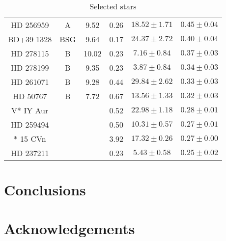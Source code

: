 \documentclass[fleqn,usenatbib]{mnras}
\begin{document}
\begin{table}
\begin{center}
\begin{tabular}{c c c c c c}
HD 256959 &A&9.52& 0.26 & $18.52\pm 1.71$& $0.45 \pm 0.04$\\
BD+39 1328&BSG&9.64 &  0.17 & $24.37  \pm    2.72$ & $0.40 \pm 0.04$\\
HD 278115&B	&10.02&  0.23 &  $7.16  \pm    0.84$ & $0.37 \pm 0.03$\\
HD 278199&B	&9.35&  0.23 &  $3.87   \pm   0.84$ & $ 0.34 \pm 0.03$\\
HD 261071&B	&9.28 &  0.44 & $29.84  \pm    2.62$ & $0.33  \pm 0.03$\\
HD  50767&B	&7.72 &  0.67 & $13.56  \pm    1.33$ & $0.32 \pm 0.03$\\
V* IY Aur &&   &  0.52 & $22.98 \pm     1.18$ & $0.28  \pm 0.01$\\
HD 259494 &&   &  0.50 & $10.31   \pm   0.57$ & $0.27 \pm 0.01$\\
*  15 CVn  &&  &  3.92 & $17.32  \pm    0.26$ & $0.27 \pm 0.00$\\
HD 237211  &&  &  0.23 &  $5.43 \pm     0.58$ & $0.25 \pm 0.02$\\

\hline
\end{tabular}
\caption{Selected stars}
 \label{tab:significance}
\end{center}
\end{table}
\section{Conclusions}



\section*{Acknowledgements}











\appendix



\bsp	%
\label{lastpage}
\end{document}
